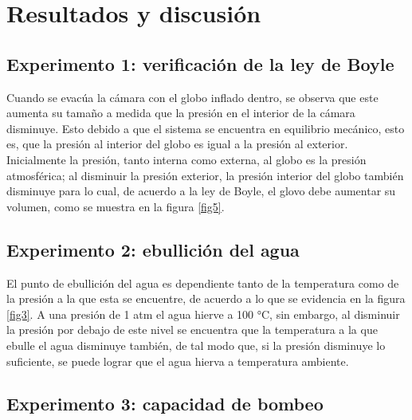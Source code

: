 \documentclass[final,5p,times,twocolumn, nopreprintline]{elsarticle}
\numberwithin{equation}{section}
\begin{document}
\section{Resultados y discusión}

\subsection{Experimento 1: verificación de la ley de Boyle}

Cuando se evacúa la cámara con el globo inflado dentro, se observa que este aumenta su tamaño a medida que la presión en el interior de la cámara disminuye. Esto debido a que el sistema se encuentra en equilibrio mecánico, esto es, que la presión al interior del globo es igual a la presión al exterior. Inicialmente la presión, tanto interna como externa, al globo es la presión atmosférica; al disminuir la presión exterior, la presión interior del globo también disminuye para lo cual, de acuerdo a la ley de Boyle, el glovo debe aumentar su volumen, como se muestra en la figura \ref{fig5}.


\subsection{Experimento 2: ebullición del agua}

El punto de ebullición del agua es dependiente tanto de la temperatura como de la presión a la que esta se encuentre, de acuerdo a lo que se evidencia en la figura \ref{fig3}. A una presión de 1 atm el agua hierve a 100 °C, sin embargo, al disminuir la presión por debajo de este nivel se encuentra que la temperatura a la que ebulle el agua disminuye también, de tal modo que, si la presión disminuye lo suficiente, se puede lograr que el agua hierva a temperatura ambiente.

\subsection{Experimento 3: capacidad de bombeo}
\end{document}
